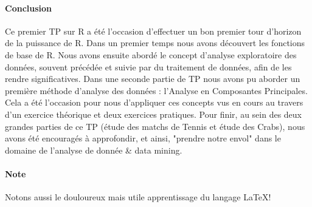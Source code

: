 \documentclass{report}
\begin{document}
\paragraph{Conclusion}
Ce premier TP sur R a été l'occasion d'effectuer un bon premier tour d'horizon de la puissance de R. Dans un premier temps nous avons découvert les fonctions de base de R. Nous avons ensuite abordé le concept d'analyse exploratoire des données, souvent précédée et suivie par du traitement de données, afin de les rendre significatives. Dans une seconde partie de TP nous avons pu aborder un première méthode d'analyse des données : l'Analyse en Composantes Principales. Cela a été l'occasion pour nous d'appliquer ces concepts vus en cours au travers d'un exercice théorique et deux exercices pratiques. Pour finir, au sein des deux grandes parties de ce TP (étude des matchs de Tennis et étude des Crabs), nous avons été encouragés à approfondir, et ainsi, "prendre notre envol" dans le domaine de l'analyse de donnée \& data mining.

\paragraph{Note}
Notons aussi le douloureux mais utile apprentissage du langage \LaTeX !
\end{document}
